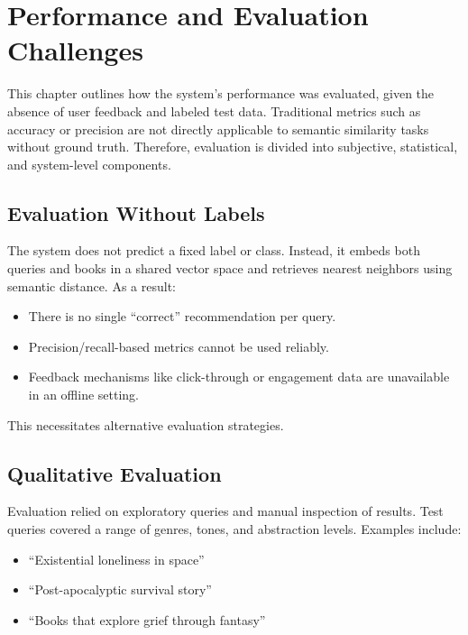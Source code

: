 \chapter{Performance and Evaluation Challenges}
\label{chapter:performance}

This chapter outlines how the system’s performance was evaluated, given the absence of user feedback and labeled test data. Traditional metrics such as accuracy or precision are not directly applicable to semantic similarity tasks without ground truth. Therefore, evaluation is divided into subjective, statistical, and system-level components.

\section{Evaluation Without Labels}
\label{sec:no-labels}

The system does not predict a fixed label or class. Instead, it embeds both queries and books in a shared vector space and retrieves nearest neighbors using semantic distance. As a result:

\begin{itemize}
    \item There is no single “correct” recommendation per query.
    \item Precision/recall-based metrics cannot be used reliably.
    \item Feedback mechanisms like click-through or engagement data are unavailable in an offline setting.
\end{itemize}

This necessitates alternative evaluation strategies.

\section{Qualitative Evaluation}
\label{sec:qualitative-eval}

Evaluation relied on exploratory queries and manual inspection of results. Test queries covered a range of genres, tones, and abstraction levels. Examples include:

\begin{itemize}
    \item ``Existential loneliness in space''
    \item ``Post-apocalyptic survival story''
    \item ``Books that explore grief through fantasy''
\end{itemize}

